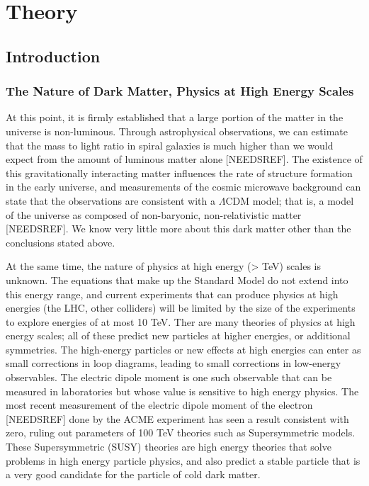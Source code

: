 \documentclass[11pt]{book}
\begin{document}
\tableofcontents

\chapter{Theory}
\section{Introduction}
\subsection{The Nature of Dark Matter, Physics at High Energy Scales}

At this point, it is firmly established that a large portion of the matter in the universe is non-luminous. Through astrophysical observations, we can estimate that the mass to light ratio in spiral galaxies is much higher than we would expect from the amount of luminous matter alone [NEEDSREF]. The existence of this gravitationally interacting matter influences the rate of structure formation in the early universe, and measurements of the cosmic microwave background can state that the observations are consistent with a $\Lambda$CDM model; that is, a model of the universe as composed of non-baryonic, non-relativistic matter [NEEDSREF]. We know very little more about this dark matter other than the conclusions stated above.

At the same time, the nature of physics at high energy (> TeV) scales is unknown. The equations that make up the Standard Model do not extend into this energy range, and current experiments that can produce physics at high energies (the LHC, other colliders) will be limited by the size of the experiments to explore energies of at most 10 TeV. Ther are many theories of physics at high energy scales; all of these predict new particles at higher energies, or additional symmetries. The high-energy particles or new effects at high energies can enter as small corrections in loop diagrams, leading to small corrections in low-energy observables. The electric dipole moment is one such observable that can be measured in laboratories but whose value is sensitive to high energy physics. The most recent measurement of the electric dipole moment of the electron [NEEDSREF] done by the ACME experiment has seen a result consistent with zero, ruling out parameters of 100 TeV theories such as Supersymmetric models. These Supersymmetric (SUSY) theories are high energy theories that solve problems in high energy particle physics, and also predict a stable particle that is a very good candidate for the particle of cold dark matter.
\end{document}
